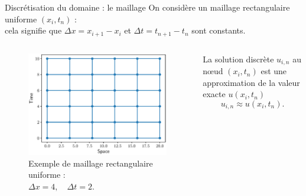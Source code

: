 \documentclass[aspectratio=169, french]{beamer}
\begin{document}
\begin{frame}{Discrétisation du domaine : le maillage}
On considère un maillage rectangulaire uniforme $(x_i, t_n)$ : \\
cela signifie que $\Delta x = x_{i+1}- x_i $ et $\Delta t = t_{n+1}- t_n$ sont constants. \\
  

	\begin{columns}
	\begin{column}{.5\textwidth}
	\begin{figure}
		\includegraphics[height=.5\textheight]{mesh.eps}
		\caption*{Exemple de maillage rectangulaire uniforme :\\ $\Delta x = 4, \quad \Delta t=2$.}
	\end{figure}	
	\end{column}
	\begin{column}{.5\textwidth}
		\begin{tcolorbox}
			La solution discrète $u_{i, n}$ au n\oe{}ud $(x_i, t_n)$ est une approximation  de la valeur exacte $u(x_i, t_n)$
			\begin{equation*}
				u_{i, n} \approx u(x_i, t_n).
			\end{equation*} 
		\end{tcolorbox}
	
	\end{column}
\end{columns}	

\end{frame}
\end{document}
